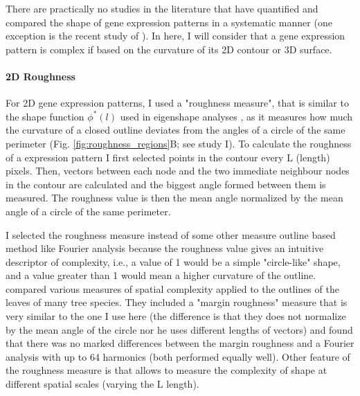 There are practically no studies in the literature that have quantified and compared the shape of gene expression patterns in a systematic manner (one exception is the recent study of \citealp{Martinez-Abadias2016}). In here, I will consider that a gene expression pattern is complex if based on the curvature of its 2D contour or 3D surface.

\paragraph{2D Roughness}
For 2D gene expression patterns, I used a "roughness measure", that is similar to the shape function $\phi^{*}(l)$ used in eigenshape analyses \citep{Lohmann1983}, as it measures how much the curvature of a closed outline deviates from the angles of a circle of the same perimeter (Fig. \ref{fig:roughness_regions}B; see study I). 
To calculate the roughness of a expression pattern I first selected points in the contour every L (length) pixels. Then, vectors between each node and the two immediate neighbour nodes in the contour are calculated and the biggest angle formed between them is measured. The roughness value is then the mean angle normalized by the mean angle of a circle of the same perimeter.

I selected the roughness measure instead of some other measure outline based method like Fourier analysis because the roughness value gives an intuitive descriptor of complexity, i.e., a value of 1 would be a simple "circle-like" shape, and a value greater than 1 would mean a higher curvature of the outline. \citet{McLellan1998} compared various measures of spatial complexity applied to the outlines of the leaves of many tree species. They included a "margin roughness" measure that is very similar to the one I use here (the difference is that they does not normalize by the mean angle of the circle nor he uses different lengths of vectors) and found that there was no marked differences between the margin roughness and a Fourier analysis with up to 64 harmonics (both performed equally well).
Other feature of the roughness measure is that allows to measure the complexity of shape at different spatial scales (varying the L length). 

